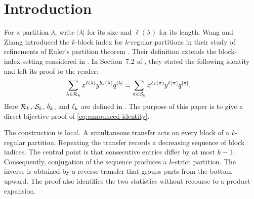 \section{Introduction}

For a partition $\lambda$, write $|\lambda|$ for its size and
$\ell(\lambda)$ for its length. Wang and Zhang introduced the $k$-block index
for $k$-regular partitions in their study of refinements of Euler's partition
theorem \cite{WangZhang2026}. Their definition extends the block-index setting
considered in \cite{LiWangXu2026}. In Section~7.2 of \cite{WangZhang2026},
they stated the following identity and left its proof to the reader:
\begin{equation}\label{eq:announced-identity}
 \sum_{\lambda\in\mathcal{R}_k}x^{\ell(\lambda)}y^{b_k(\lambda)}q^{|\lambda|}
 =
 \sum_{\pi\in\mathcal{S}_k}x^{\ell_k(\pi)}y^{\ell(\pi)}q^{|\pi|}.
\end{equation}
Here $\mathcal{R}_k$, $\mathcal{S}_k$, $b_k$, and $\ell_k$ are defined in
. The purpose of this paper is to give a direct
bijective proof of \eqref{eq:announced-identity}.

The construction is local. A simultaneous transfer acts on every block of a
$k$-regular partition. Repeating the transfer records a decreasing sequence
of block indices. The central point is that consecutive entries differ by at
most $k-1$. Consequently, conjugation of the sequence produces a $k$-strict
partition. The inverse is obtained by a reverse transfer that groups parts
from the bottom upward. The proof also identifies the two statistics without
recourse to a product expansion.

